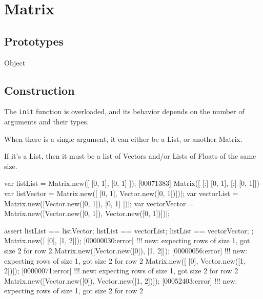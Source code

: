 
\section{Matrix}

\subsection{Prototypes}
\begin{refObjects}
\item[Object]
\end{refObjects}

\subsection{Construction}
\label{sec:specs:matrix:ctor}

The \lstinline|init| function is overloaded, and its behavior depends on the
number of arguments and their types.

When there is a single argument, it can either be a List, or another Matrix.

If it's a List, then it must be a list of Vectors and/or Lists of Floats of
the same size.

\begin{urbiscript}
var listList     = Matrix.new([           [0, 1],             [0, 1] ]);
[00071383] Matrix([
[:]  [0, 1],
[:]  [0, 1]])
var listVector   = Matrix.new([           [0, 1],  Vector.new([0, 1])])|;
var vectorList   = Matrix.new([Vector.new([0, 1]),            [0, 1] ])|;
var vectorVector = Matrix.new([Vector.new([0, 1]), Vector.new([0, 1])])|;

assert
{
  listList == listVector;
  listList == vectorList;
  listList == vectorVector;
};
Matrix.new([           [0],            [1, 2]]);
[00000030:error] !!! new: expecting rows of size 1, got size 2 for row 2
Matrix.new([Vector.new([0]),           [1, 2]]);
[00000056:error] !!! new: expecting rows of size 1, got size 2 for row 2
Matrix.new([           [0], Vector.new([1, 2])]);
[00000071:error] !!! new: expecting rows of size 1, got size 2 for row 2
Matrix.new([Vector.new([0]), Vector.new([1, 2])]);
[00052403:error] !!! new: expecting rows of size 1, got size 2 for row 2
\end{urbiscript}

